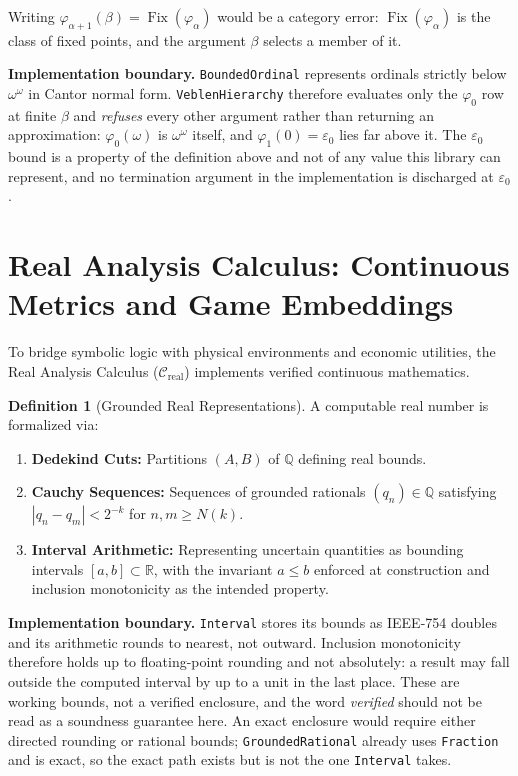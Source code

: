 \documentclass[11pt]{article}
\theoremstyle{definition}
\newtheorem{definition}[theorem]{Definition}
\newcommand{\Q}{\mathbb Q}
\newcommand{\R}{\mathbb R}
\newcommand{\Fix}{\operatorname{Fix}}
\begin{document}
\noindent Writing $\varphi_{\alpha+1}(\beta) = \Fix(\varphi_\alpha)$ would be a category error: $\Fix(\varphi_\alpha)$ is the class of fixed points, and the argument $\beta$ selects a member of it.

\noindent\textbf{Implementation boundary.} \texttt{BoundedOrdinal} represents ordinals strictly below $\omega^\omega$ in Cantor normal form. \texttt{VeblenHierarchy} therefore evaluates only the $\varphi_0$ row at finite $\beta$ and \emph{refuses} every other argument rather than returning an approximation: $\varphi_0(\omega)$ is $\omega^\omega$ itself, and $\varphi_1(0) = \varepsilon_0$ lies far above it. The $\varepsilon_0$ bound is a property of the definition above and not of any value this library can represent, and no termination argument in the implementation is discharged at $\varepsilon_0$.

\section{Real Analysis Calculus: Continuous Metrics and Game Embeddings}
To bridge symbolic logic with physical environments and economic utilities, the Real Analysis Calculus ($\mathcal{C}_{\mathrm{real}}$) implements verified continuous mathematics.

\begin{definition}[Grounded Real Representations]
A computable real number is formalized via:
\begin{enumerate}
\item \textbf{Dedekind Cuts:} Partitions $(A, B)$ of $\Q$ defining real bounds.
\item \textbf{Cauchy Sequences:} Sequences of grounded rationals $(q_n) \in \Q$ satisfying $|q_n - q_m| < 2^{-k}$ for $n, m \ge N(k)$.
\item \textbf{Interval Arithmetic:} Representing uncertain quantities as bounding intervals $[a, b] \subset \R$, with the invariant $a \le b$ enforced at construction and inclusion monotonicity as the intended property.
\end{enumerate}
\end{definition}

\noindent\textbf{Implementation boundary.} \texttt{Interval} stores its bounds as IEEE-754 doubles and its arithmetic rounds to nearest, not outward. Inclusion monotonicity therefore holds up to floating-point rounding and not absolutely: a result may fall outside the computed interval by up to a unit in the last place. These are working bounds, not a verified enclosure, and the word \emph{verified} should not be read as a soundness guarantee here. An exact enclosure would require either directed rounding or rational bounds; \texttt{GroundedRational} already uses \texttt{Fraction} and is exact, so the exact path exists but is not the one \texttt{Interval} takes.
\end{document}
